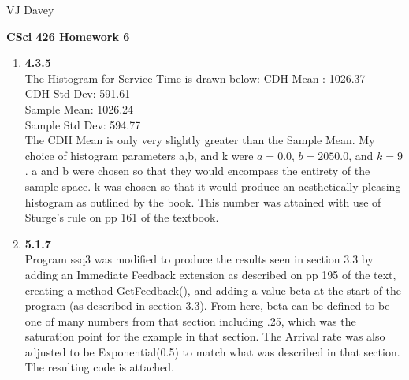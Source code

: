 \documentclass[11pt]{article}
\begin{document}
\centerline{VJ Davey}\vskip 0.10cm
\begin{LARGE}
\centerline {\bf CSci 426 Homework 6}
\end{LARGE}
\vskip 0.25cm
\begin{enumerate}
	\item \textbf{4.3.5 }
	\\The Histogram for Service Time is drawn below:
	\vskip 10cm
	CDH Mean : 1026.37
	\\CDH Std Dev: 591.61
	\\Sample Mean: 1026.24
	\\Sample Std Dev: 594.77
	\\The CDH Mean is only very slightly greater than the Sample Mean. My choice of histogram parameters a,b, and k were $a = 0.0$, $b=2050.0$, and $k=9$. a and b were chosen so that they would encompass the entirety of the sample space. k was chosen so that it would produce an aesthetically pleasing histogram as outlined by the book. This number was attained with use of Sturge's rule on pp 161 of the textbook.
	\item \textbf{5.1.7}
	\\Program ssq3 was modified to produce the results seen in section 3.3 by adding an Immediate Feedback extension as described on pp 195 of the text, creating a method GetFeedback(), and adding a value beta at the start of the program (as described in section 3.3). From here, beta can be defined to be one of many numbers from that section including .25, which was the saturation point for the example in that section. The Arrival rate was also adjusted to be Exponential(0.5) to match what was described in that section.
	The resulting code is attached.
\end{enumerate}
\end{document}
